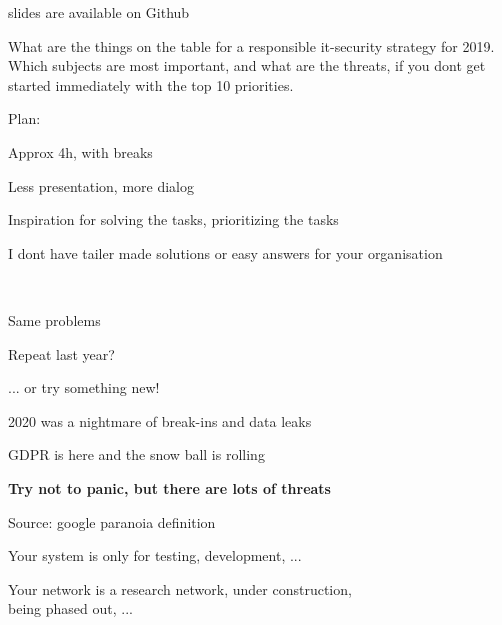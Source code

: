 \documentclass[Screen16to9,17pt]{foils}
\begin{document}


\vskip 1cm
\centerline{\footnotesize slides are available on Github}


What are the things on the table for a responsible it-security strategy for 2019. Which subjects are most important, and what are the threats, if you dont get started immediately with the top 10 priorities.


\begin{list2}
\item Plan:
\item Approx 4h, with breaks
\item Less presentation, more dialog
\item Inspiration for solving the tasks, prioritizing the tasks
\item I dont have tailer made solutions or easy answers for your organisation
\end{list2}


{~}

\begin{list2}
\item Same problems
\item Repeat last year?
\item ... or try something new!
\item 2020 was a nightmare of break-ins and data leaks
\item GDPR is here and the snow ball is rolling
\end{list2}

\vskip 1cm
{\LARGE\bf Try not to panic, but there are lots of threats}




Source: google paranoia definition




Your system is only for testing, development, ...

Your network is a research network, under construction, \\
being phased out, ...
\end{document}
